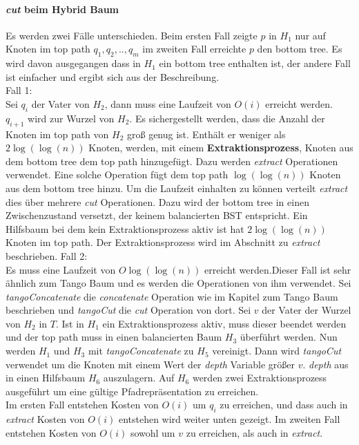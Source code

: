 \documentclass[a4paper,12pt]{article}
\begin{document}
\paragraph{\textit{cut} beim Hybrid Baum}
Es werden zwei Fälle unterschieden. Beim ersten Fall zeigte $p$ in $H_1$ nur auf Knoten im top path $q_1,q_2,..,q_m$ im zweiten Fall erreichte $p$ den bottom tree. Es wird davon ausgegangen dass in $H_1$ ein bottom tree enthalten ist, der andere Fall ist einfacher und ergibt sich aus der Beschreibung.\\
Fall 1:\\
Sei $q_i$ der Vater von $H_2$, dann muss eine Laufzeit von $O\left(i\right)$ erreicht werden. $q_{i+1}$ wird zur Wurzel von $H_2$. Es sichergestellt werden, dass die Anzahl der Knoten im top path von $H_2$ groß genug ist. Enthält er weniger als $2 \log\left(\log\left(n\right)\right)$ Knoten, werden, mit einem \textbf{Extraktionsprozess}, Knoten aus dem bottom tree dem top path hinzugefügt. Dazu werden \textit{extract} Operationen verwendet. Eine solche Operation fügt dem top path $\log\left(\log\left(n\right)\right)$ Knoten aus dem bottom tree hinzu. Um die Laufzeit einhalten zu können verteilt \textit{extract} dies über mehrere \textit{cut} Operationen. Dazu wird der bottom tree in einen Zwischenzustand versetzt, der keinem balancierten BST entspricht. Ein Hilfsbaum bei dem kein Extraktionsprozess aktiv ist hat  $2 \log\left(\log\left(n\right)\right)$ Knoten im top path. Der Extraktionsprozess wird im Abschnitt zu \textit{extract} beschrieben.  
Fall 2:\\
Es muss eine Laufzeit von $O\log\left(\log\left(n\right)\right)$ erreicht werden.Dieser Fall ist sehr ähnlich zum Tango Baum und es werden die Operationen von ihm verwendet. Sei \textit{tangoConcatenate} die \textit{concatenate} Operation wie im Kapitel zum Tango Baum beschrieben und \textit{tangoCut} die \textit{cut} Operation von dort. Sei $v$ der Vater der Wurzel von $H_2$ in $T$. Ist in $H_1$ ein Extraktionsprozess aktiv, muss dieser beendet werden und der top path muss in einen balancierten Baum $H_3$ überführt werden. Nun werden $H_1$ und $H_3$ mit \textit{tangoConcatenate}  zu $H_5$ vereinigt. Dann wird \textit{tangoCut} verwendet um die Knoten mit einem Wert der \textit{depth} Variable größer $v.$ \textit{depth} aus in einen Hilfsbaum $H_6$ auszulagern. Auf $H_6$ werden zwei Extraktionsprozess ausgeführt um eine gültige Pfadrepräsentation zu erreichen.  \\
Im ersten Fall entstehen Kosten von $O\left(i\right)$ um $q_i$ zu erreichen, und dass auch in \textit{extract} Kosten von $O\left(i\right)$ entstehen wird weiter unten gezeigt. Im zweiten Fall entstehen Kosten von $O\left(i\right)$ sowohl um $v$ zu erreichen, als auch in \textit{extract}.
\end{document}
